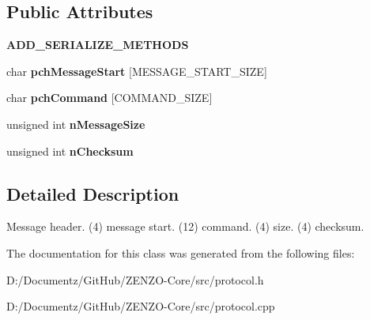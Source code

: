 \subsection*{Public Attributes}
\begin{DoxyCompactItemize}
\item 
\mbox{\label{class_c_message_header_a447044c3fbf9d5e98dcc4121ac808d2f}} 
{\bfseries A\+D\+D\+\_\+\+S\+E\+R\+I\+A\+L\+I\+Z\+E\+\_\+\+M\+E\+T\+H\+O\+DS}
\item 
\mbox{\label{class_c_message_header_a4284bf1d2fd792af89e1c93b7e6e274e}} 
char {\bfseries pch\+Message\+Start} \mbox{[}M\+E\+S\+S\+A\+G\+E\+\_\+\+S\+T\+A\+R\+T\+\_\+\+S\+I\+ZE\mbox{]}
\item 
\mbox{\label{class_c_message_header_a87d62b0d9afb3889f318991700a34431}} 
char {\bfseries pch\+Command} \mbox{[}C\+O\+M\+M\+A\+N\+D\+\_\+\+S\+I\+ZE\mbox{]}
\item 
\mbox{\label{class_c_message_header_a67ccb9f1f23af69e309a8d6c8bfff751}} 
unsigned int {\bfseries n\+Message\+Size}
\item 
\mbox{\label{class_c_message_header_ab9c6bec3694e2c110b4f358af9e55984}} 
unsigned int {\bfseries n\+Checksum}
\end{DoxyCompactItemize}


\subsection{Detailed Description}
Message header. (4) message start. (12) command. (4) size. (4) checksum. 

The documentation for this class was generated from the following files\+:\begin{DoxyCompactItemize}
\item 
D\+:/\+Documentz/\+Git\+Hub/\+Z\+E\+N\+Z\+O-\/\+Core/src/protocol.\+h\item 
D\+:/\+Documentz/\+Git\+Hub/\+Z\+E\+N\+Z\+O-\/\+Core/src/protocol.\+cpp\end{DoxyCompactItemize}
